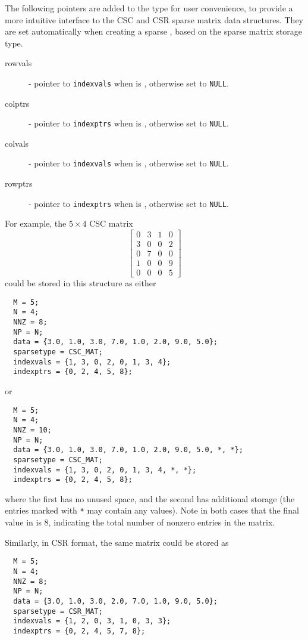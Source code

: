 \noindent The following pointers are added to the  type for
  user convenience, to provide a more intuitive interface to the CSC
  and CSR sparse matrix data structures. They are set automatically
  when creating a sparse {\sunmatrix}, based on the sparse matrix storage
  type.  
\begin{description}
  \item[rowvals] - pointer to \verb|indexvals| when  is ,
    otherwise set to \verb|NULL|.
  \item[colptrs] - pointer to \verb|indexptrs| when  is ,
    otherwise set to \verb|NULL|.
  \item[colvals] - pointer to \verb|indexvals| when  is ,
    otherwise set to \verb|NULL|.
  \item[rowptrs] - pointer to \verb|indexptrs| when  is ,
    otherwise set to \verb|NULL|.
\end{description}
For example, the $5\times 4$ CSC matrix
\[
  \left[\begin{array}{cccc} 
     0 & 3 & 1 & 0\\
     3 & 0 & 0 & 2\\
     0 & 7 & 0 & 0\\
     1 & 0 & 0 & 9\\
     0 & 0 & 0 & 5
  \end{array}\right]
\]
could be stored in this structure as either
\begin{verbatim}
  M = 5;
  N = 4;
  NNZ = 8;
  NP = N;
  data = {3.0, 1.0, 3.0, 7.0, 1.0, 2.0, 9.0, 5.0};
  sparsetype = CSC_MAT;
  indexvals = {1, 3, 0, 2, 0, 1, 3, 4};
  indexptrs = {0, 2, 4, 5, 8};
\end{verbatim}
or 
\begin{verbatim}
  M = 5;
  N = 4;
  NNZ = 10;
  NP = N;
  data = {3.0, 1.0, 3.0, 7.0, 1.0, 2.0, 9.0, 5.0, *, *};
  sparsetype = CSC_MAT;
  indexvals = {1, 3, 0, 2, 0, 1, 3, 4, *, *};
  indexptrs = {0, 2, 4, 5, 8};
\end{verbatim}
where the first has no unused space, and the second has additional
storage (the entries marked with \texttt{*} may contain any values).
Note in both cases that the final value in  is $8$,
indicating the total number of nonzero entries in the matrix.

Similarly, in CSR format, the same matrix could be stored as
\begin{verbatim}
  M = 5;
  N = 4;
  NNZ = 8;
  NP = N;
  data = {3.0, 1.0, 3.0, 2.0, 7.0, 1.0, 9.0, 5.0};
  sparsetype = CSR_MAT;
  indexvals = {1, 2, 0, 3, 1, 0, 3, 3};
  indexptrs = {0, 2, 4, 5, 7, 8};
\end{verbatim}

